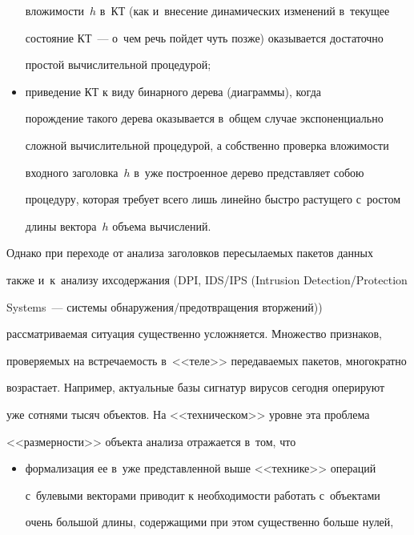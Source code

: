 \begin{multicols}{2}
\begin{itemize}
вложимости~$h$ в~КТ (как и~внесение динамических изменений в~текущее 


состояние КТ~--- о~чем речь пойдет чуть позже) оказывается достаточно 


простой вычислительной процедурой; 


\item приведение КТ к виду бинарного дерева (диаграммы), когда 


порождение такого дерева оказывается в~общем случае экспоненциально 


сложной вычислительной процедурой, а собственно проверка вложимости 


входного заголовка~$h$ в~уже построенное дерево представляет собою 


процедуру, которая требует всего лишь линейно быстро растущего с~ростом 


длины вектора~$h$ объема вычислений.


\end{itemize}





  Однако при переходе от анализа заголовков пересылаемых пакетов данных 


также и~к~анализу их\linebreak  содержания (DPI, IDS/IPS (Intrusion Detection/\linebreak Protection 


Systems~--- системы обна\-ру\-же\-ния/пред\-от\-вра\-ще\-ния вторжений)) 


рас\-смат\-ри\-ва\-емая ситуация существенно усложняется. Множество признаков, 


проверяемых на встречаемость в~<<теле>> переда\-ва\-емых пакетов, многократно 


возрастает. Например, актуальные базы сигнатур вирусов сегодня оперируют 


уже сотнями тысяч объектов. На <<техническом>> уровне эта проблема 


<<размерности>> объекта анализа отражается в~том, что


\begin{itemize}


\item формализация ее в~уже представленной выше <<технике>> операций 


с~булевыми векторами приводит к необходимости работать с~объектами 


очень большой длины, содержащими при этом существенно больше нулей, 



\end{itemize}
\end{multicols}
